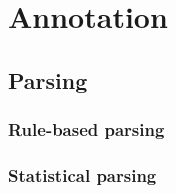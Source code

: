 \chapter{Annotation}
\label{chp:annotation}
\minitoc\mtcskip
\section{Parsing}
\label{sect:parsing}
\subsection{Rule-based parsing}
\label{subsect:rulebasedparsing}
\subsection{Statistical parsing}
\label{subsection{statisticalparsing}}
